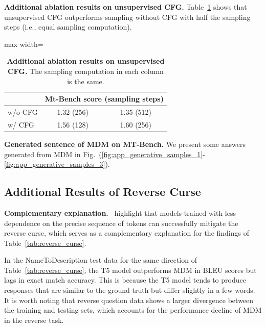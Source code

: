 \documentclass{article} %
\begin{document}
\textbf{Additional ablation results on unsupervised CFG.} Table~\ref{tab:app_mt_bench_equal_sampling_computation} shows that unsupervised CFG outperforms sampling without CFG with half the sampling steps (i.e., equal sampling computation).

\begin{table}[t!]
    \centering
    \caption{\textbf{Additional ablation results on unsupervised CFG.} The sampling computation in each column is the same.}
    \label{tab:app_mt_bench_equal_sampling_computation}
    \begin{adjustbox}{max width=\textwidth}
    \begin{tabular}{lcc}
        \toprule
         & \multicolumn{2}{c}{Mt-Bench score (sampling steps)} \\
         \midrule
         w/o CFG & 1.32 (256) & 1.35 (512) \\
         \midrule
         w/ CFG & 1.56 (128) & 1.60 (256) \\
         \bottomrule
    \end{tabular}
    \end{adjustbox}
\end{table}


\textbf{Generated sentence of MDM on MT-Bench.} We present some answers generated from MDM in Fig.~(\ref{fig:app_generative_samples_1}-\ref{fig:app_generative_samples_3}).






\subsection{Additional Results of Reverse Curse}
\label{app:sec_results_reverse}
\textbf{Complementary explanation.}~\cite{kitouni2024factorization} highlight that models trained with less dependence on the precise sequence of tokens can successfully mitigate the reverse curse, which serves as a complementary explanation for the findings of Table~\ref{tab:reverse_curse}.

In the NameToDescription test data for the same direction of Table~\ref{tab:reverse_curse}, the T5 model outperforms MDM in BLEU scores but lags in exact match accuracy. This is because the T5 model tends to produce responses that are similar to the ground truth but differ slightly in a few words. It is worth noting that reverse question data shows a larger divergence between the training and testing sets, which accounts for the performance decline of MDM in the reverse task.
\end{document}
